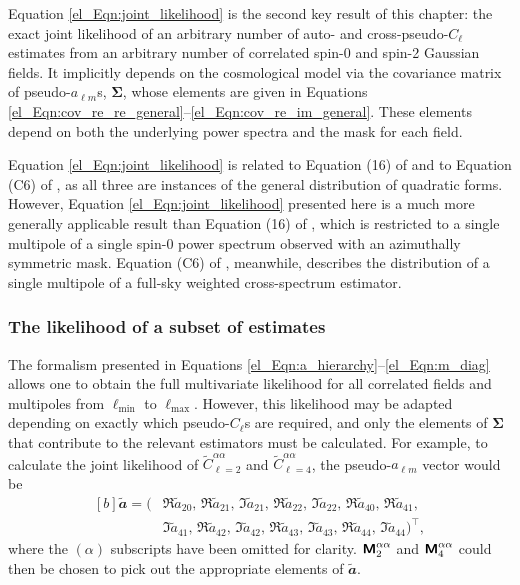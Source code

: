 Equation \eqref{el_Eqn:joint_likelihood} is the second key result of this chapter: the exact joint likelihood of an arbitrary number of auto- and cross-pseudo-$C_\ell$ estimates from an arbitrary number of correlated spin-0 and spin-2 Gaussian fields. It implicitly depends on the cosmological model via the covariance matrix of pseudo-$a_{\ell m}$s, $\bm{\Sigma}$, whose elements are given in Equations \eqref{el_Eqn:cov_re_re_general}--\eqref{el_Eqn:cov_re_im_general}. These elements depend on both the underlying power spectra and the mask for each field.

Equation \eqref{el_Eqn:joint_likelihood} is related to Equation (16) of \citet{Wandelt2001} and to Equation (C6) of \citet{Hamimeche2008}, as all three are instances of the general distribution of quadratic forms. However, Equation \eqref{el_Eqn:joint_likelihood} presented here is a much more generally applicable result than Equation (16) of \citet{Wandelt2001}, which is restricted to a single multipole of a single spin-0 power spectrum observed with an azimuthally symmetric mask. Equation (C6) of \citet{Hamimeche2008}, meanwhile, describes the distribution of a single multipole of a full-sky weighted cross-spectrum estimator.

\subsubsection{The likelihood of a subset of \texorpdfstring{\pcl{}}{pseudo-Cl} estimates}

The formalism presented in Equations \eqref{el_Eqn:a_hierarchy}--\eqref{el_Eqn:m_diag} allows one to obtain the full multivariate likelihood for all correlated fields and multipoles from $\ell_\mathrm{min}$ to $\ell_\mathrm{max}$. However, this likelihood may be adapted depending on exactly which pseudo-$C_\ell$s are required, and only the elements of $\bm{\Sigma}$ that contribute to the relevant estimators must be calculated. For example, to calculate the joint likelihood of $\widetilde{C}_{\ell = 2}^{\alpha \alpha}$ and $\widetilde{C}_{\ell = 4}^{\alpha \alpha}$, the pseudo-$a_{\ell m}$ vector would be
\begin{equation}
\begin{aligned}[b]
    \widetilde{\mathbfit{a}} =
    \big(
    &\Re \widetilde{a}_{2 0},\,
    \Re \widetilde{a}_{2 1},\,
    \Im \widetilde{a}_{2 1},\,
    \Re \widetilde{a}_{2 2},\,
    \Im \widetilde{a}_{2 2},\,
    \Re \widetilde{a}_{4 0},\,
    \Re \widetilde{a}_{4 1},\, \\
    &\Im \widetilde{a}_{4 1},\,
    \Re \widetilde{a}_{4 2},\,
    \Im \widetilde{a}_{4 2},\,
    \Re \widetilde{a}_{4 3},\,
    \Im \widetilde{a}_{4 3},\,
    \Re \widetilde{a}_{4 4},\,
    \Im \widetilde{a}_{4 4}
    \big)^\intercal,
\end{aligned}
\end{equation}
where the $\left( \alpha \right)$ subscripts have been omitted for clarity. $\bm{\mathsf{M}}_2^{\alpha \alpha}$ and $\bm{\mathsf{M}}_4^{\alpha \alpha}$ could then be chosen to pick out the appropriate elements of $\widetilde{\mathbfit{a}}$.

